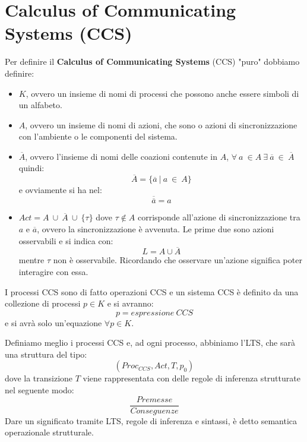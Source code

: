 \section{Calculus of Communicating Systems (CCS)}
\begin{definizione}
    Per definire il \textbf{Calculus of Communicating Systems} (CCS) "puro" dobbiamo definire:
    \begin{itemize}
        \item  $K$, ovvero un insieme di nomi di processi che possono anche essere
              simboli di un alfabeto.
        \item  $A$, ovvero un insieme di nomi di azioni, che sono o azioni di
              sincronizzazione con l'ambiente o le componenti del sistema.
        \item $\overline{A}$, ovvero l'insieme di nomi delle coazioni contenute
              in $A$, $\forall \ a \ \in A \ \exists \ \overline{a} \ \in \ \overline{A}$
              quindi: $$\overline{A} = \{\overline{a} \ | \ a \ \in \ A\}$$ e ovviamente
              si ha nel: $$\overline{\overline{a}} = a$$
        \item $Act = A \ \cup  \ \overline{A} \ \cup \ \{\tau\}$ dove $\tau \notin A$
              corrisponde all'azione di sincronizzazione tra $a$ e $\overline{a}$,
              ovvero la sincronizzazione è avvenuta. Le prime due sono azioni osservabili
              e si indica con: $$L = A \cup \overline{A}$$ mentre $\tau$ non è
              osservabile. Ricordando che osservare un'azione significa poter
              interagire con essa.
    \end{itemize}
\end{definizione}
\begin{definizione}
    I processi CCS sono di fatto operazioni CCS e un sistema CCS è definito da
    una collezione di processi $p \in K$ e si avranno: $$p = espressione \ CCS$$
    e si avrà solo un'equazione $\forall p \in K$.
\end{definizione}
Definiamo meglio i processi CCS e, ad ogni processo, abbiniamo l'LTS, che sarà
una struttura del tipo: $$(Proc_{CCS}, Act, T, p_0)$$ dove la transizione $T$
viene rappresentata con delle regole di inferenza strutturate nel seguente modo:
$$\frac{Premesse}{Conseguenze}$$ Dare un significato tramite LTS, regole di inferenza
e sintassi, è detto semantica operazionale strutturale.

